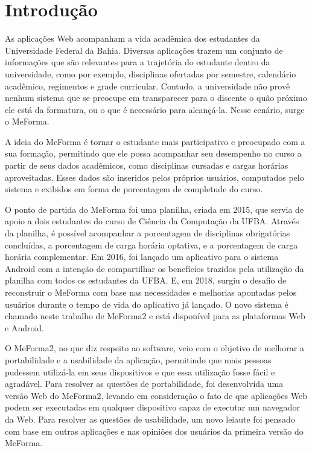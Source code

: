 \chapter{Introdução}

As aplicações Web acompanham a vida acadêmica dos estudantes da Universidade Federal da Bahia. Diversas aplicações trazem um conjunto de informações que são relevantes para a trajetória do estudante dentro da universidade, como por exemplo, disciplinas ofertadas por semestre, calendário acadêmico, regimentos e grade curricular. Contudo, a universidade não provê nenhum sistema que se preocupe em transparecer para o discente o quão próximo ele está da formatura, ou o que é necessário para alcançá-la. Nesse cenário, surge o MeForma.

A ideia do MeForma é tornar o estudante mais participativo e preocupado com a sua formação, permitindo que ele possa acompanhar seu desempenho no curso a partir de seus dados acadêmicos, como disciplinas cursadas e cargas horárias aproveitadas. Esses dados são inseridos pelos próprios usuários, computados pelo sistema e exibidos em forma de porcentagem de completude do curso.

O ponto de partida do MeForma foi uma planilha, criada em 2015, que servia de apoio a dois estudantes do curso de Ciência da Computação da UFBA. Através da planilha, é possível acompanhar a porcentagem de disciplinas obrigatórias concluídas, a porcentagem de carga horária optativa, e a porcentagem de carga horária complementar. Em 2016, foi lançado um aplicativo para o sistema Android com a intenção de compartilhar os benefícios trazidos pela utilização da planilha com todos os estudantes da UFBA. E, em 2018, surgiu o desafio de reconstruir o MeForma com base nas necessidades e melhorias apontadas pelos usuários durante o tempo de vida do aplicativo já lançado. O novo sistema é chamado neste trabalho de MeForma2 e está disponível para as plataformas Web e Android.

O MeForma2, no que diz respeito ao software, veio com o objetivo de melhorar a portabilidade e a usabilidade da aplicação, permitindo que mais pessoas pudessem utilizá-la em seus dispositivos e que essa utilização fosse fácil e agradável. Para resolver as questões de portabilidade, foi desenvolvida uma versão Web do MeForma2, levando em consideração o fato de que aplicações Web podem ser executadas em qualquer dispositivo capaz de executar um navegador da Web. Para resolver as questões de usabilidade, um novo leiaute foi pensado com base em outras aplicações e nas opiniões dos usuários da primeira versão  do MeForma.

